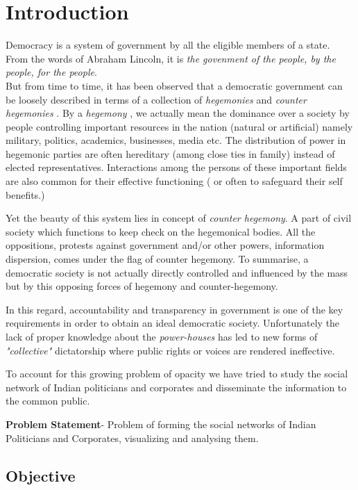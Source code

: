 \chapter{Introduction}

Democracy is a system of government by all the eligible members of a state. From the words of Abraham Lincoln, it is \emph{the govenment of the people, by the people, for the people}.\\  But from time to time, it has been observed that a democratic government can be loosely described in terms of a collection of \emph{ hegemonies } and \emph{ counter hegemonies }. By a \emph{ hegemony }, we actually mean the dominance over a society by people controlling important resources in the nation (natural or artificial) namely military, politics, academics, businesses, media etc. The distribution of power in hegemonic parties are often hereditary (among close ties in family) instead of elected representatives. Interactions among the persons of these important fields are also common for their effective functioning ( or often to safeguard their self benefits.)

Yet the beauty of this system lies in concept of \emph{counter hegemony}. A part of civil society which functions to keep check on the hegemonical bodies. All the oppositions, protests against government and/or other powers, information dispersion, comes under the flag of counter hegemony. To summarise, a democratic society is not actually directly controlled and influenced by the mass but by this opposing forces of hegemony and counter-hegemony.

In this regard, accountability and transparency in government is one of the key requirements in order to obtain an ideal democratic society. Unfortunately the lack of proper knowledge about the \emph{power-houses} has led to new forms of \emph{ "collective" } dictatorship where public rights or voices are rendered ineffective.

To account for this growing problem of opacity we have tried to study the social network of Indian politicians and corporates and disseminate the information to the common public.

\textbf{Problem Statement}-
Problem of forming the social networks of Indian Politicians and Corporates, visualizing  and analysing them.

\section{Objective}

